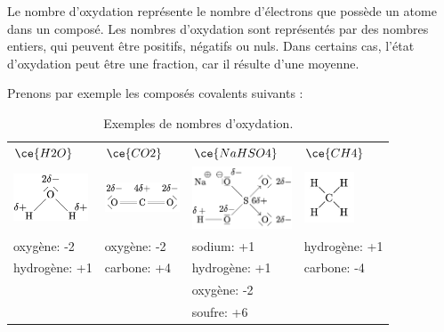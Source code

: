 \documentclass[
  11pt,
  a4paper,
  openany]{book}
\begin{document}
Le nombre d'oxydation représente le nombre d'électrons que possède un atome dans un composé. Les nombres d'oxydation sont représentés par des nombres entiers, qui peuvent être positifs, négatifs ou nuls. Dans certains cas, l'état d'oxydation peut être une fraction, car il résulte d'une moyenne.

Prenons par exemple les composés covalents suivants :

\begin{longtable}[]{@{}
  >{\centering\arraybackslash}p{}
  >{\centering\arraybackslash}p{}
  >{\centering\arraybackslash}p{}
  >{\centering\arraybackslash}p{}@{}}
\caption{\label{tab:tab-NO-examples} Exemples de nombres d'oxydation.}\tabularnewline
\toprule()
\endhead
\(\ce{H2O}\) & \(\ce{CO2}\) & \(\ce{NaHSO4}\) & \(\ce{CH4}\) \\
\includegraphics[width=6em,height=\textheight]{images/mol2D/H2O-charge.png} & \includegraphics[width=6em,height=\textheight]{images/mol2D/CO2-charge.png} & \includegraphics[width=8em,height=\textheight]{images/mol2D/NaHSO4-charge.png} & \includegraphics[width=4em,height=\textheight]{images/mol2D/CH4.jpg} \\
oxygène: -2 & oxygène: -2 & sodium: +1 & hydrogène: +1 \\
hydrogène: +1 & carbone: +4 & hydrogène: +1 & carbone: -4 \\
& & oxygène: -2 & \\
& & soufre: +6 & \\
\bottomrule()
\end{longtable}
\end{document}
